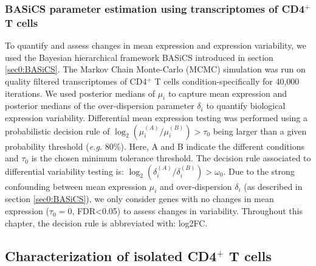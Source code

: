 \subsubsection{BASiCS parameter estimation using transcriptomes of CD4$^+$ T cells}
To quantify and assess changes in mean expression and expression variability, we used the Bayesian hierarchical framework BASiCS introduced in section \ref{sec0:BASiCS}. The Markov Chain Monte-Carlo (MCMC) simulation was run on quality filtered transcriptomes of CD4$^+$ T cells condition-specifically for 40,000 iterations. We used posterior medians of $\mu_i$ to capture mean expression and posterior medians of the over-dispersion parameter $\delta_i$ to quantify biological expression variability. Differential mean expression testing was performed using a probabilistic decision rule of $\log_2(\mu_i^{(A)}/\mu_i^{(B)})>\tau_0$ being larger than a given probability threshold (\emph{e.g.} 80\%). Here, A and B indicate the different conditions and $\tau_0$ is the chosen minimum tolerance threshold. The decision rule associated to differential variability testing is: $\log_2(\delta_i^{(A)}/\delta_i^{(B)})>\omega_0$. Due to the strong confounding between mean expression $\mu_i$ and over-dispersion $\delta_i$ (as described in section \ref{sec0:BASiCS}), we only consider genes with no changes in mean expression ($\tau_0=0$, FDR<0.05) to assess changes in variability. Throughout this chapter, the decision rule is abbreviated with: log2FC. 

\newpage

\subsection{Characterization of isolated CD4$^+$ T cells}

